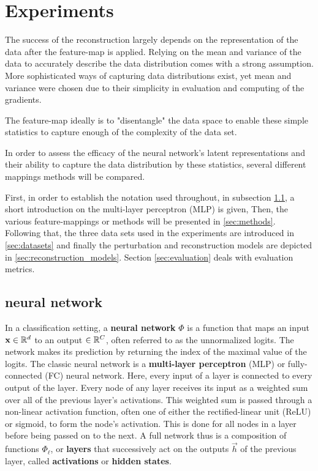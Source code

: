 
\chapter{Experiments}
\label{chap:Experiments} 

The success of the reconstruction largely depends on the representation of the data
after the feature-map is applied.
Relying on the mean and variance of the data to accurately describe the data distribution 
comes with a strong assumption.
More sophisticated ways of capturing data distributions exist, yet mean and variance were chosen due to their simplicity in evaluation and computing of the gradients.

The feature-map ideally is to "disentangle" the data space to enable 
these simple statistics to capture enough of the complexity of the data set.

In order to assess the efficacy of the neural network's latent representations 
and their ability to capture the data distribution by these statistics,
several different mappings methods will be compared. 

First, in order to establish the notation used throughout, in subsection \ref{sec:nn_def}, 
a short introduction on the multi-layer perceptron (MLP) is given,
Then, the various feature-mappings or methods will be presented in \ref{sec:methods}.
Following that, the three data sets used in the experiments are introduced in \ref{sec:datasets}
and finally the perturbation and reconstruction models are depicted in \ref{sec:reconstruction_models}.
Section \ref{sec:evaluation} deals with evaluation metrics.

\section{neural network}
\label{sec:nn_def}

In a classification setting, a \textbf{neural network} $\Phi$ is a function that maps an input $\mathbf x \in \mathbb{R}^d$ to an output $\in \mathbb{R}^C$,
often referred to as the unnormalized logits. 
The network makes its prediction by returning the index of the maximal value of the logits.
The classic neural network is a \textbf{multi-layer perceptron} (MLP) or fully-connected (FC) neural network.
Here, every input of a layer is connected to every output of the layer.
Every node of any layer receives its input as a weighted sum over all of the previous layer's activations.
This weighted sum is passed through a non-linear activation function, often one of either the rectified-linear unit (ReLU) or sigmoid, to form the node's activation. 
This is done for all nodes in a layer before being passed on to the next.
A full network thus is a composition of functions $\Phi_\ell$, or \textbf{layers} that 
successively act on the outputs $\vec h$ of the previous layer, called \textbf{activations} or \textbf{hidden states}. 

